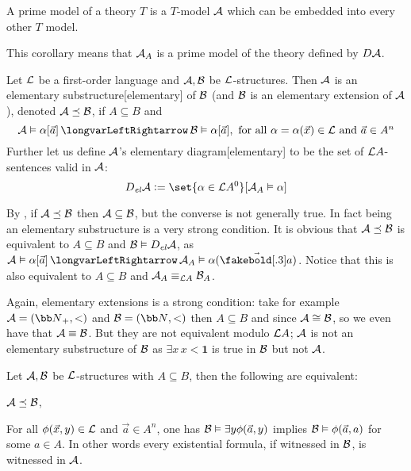 \bdefn

    A {\emphcolor prime model} of a theory $T$ is a $T$-model ${\cal A}$ which can be embedded into every other $T$ model.

\edefn

This corollary means that ${\cal A}_A$ is a prime model of the theory defined by $D{\cal A}$.

\bdefn

    Let ${\cal L}$ be a first-order language and ${\cal A},{\cal B}$ be ${\cal L}$-structures.
    Then ${\cal A}$ is an {\emphcolor elementary substructure}[elementary] of ${\cal B}$ (and ${\cal B}$ is an {\emphcolor elementary extension} of ${\cal A}$),
    denoted ${\cal A}\preceq{\cal B}$, if $A\subseteq B$ and
    $$ {\cal A}\vDash\alpha[\vec a]\iff {\cal B}\vDash\alpha[\vec a],\hbox{ for all $\alpha=\alpha(\vec x)\in{\cal L}$ and $\vec a\in A^n$} $$
    Further let us define ${\cal A}$'s {\emphcolor elementary diagram}[elementary] to be the set of ${\cal L}A$-sentences valid in ${\cal A}$:
    $$ D_{\it el}{\cal A}\coloneqq\set{\alpha\in{\cal L}A^0}[{\cal A}_A\vDash\alpha] $$

\edefn

By , if ${\cal A}\preceq{\cal B}$ then ${\cal A}\subseteq{\cal B}$, but the converse is not generally true.
In fact being an elementary substructure is a very strong condition.
It is obvious that ${\cal A}\preceq{\cal B}$ is equivalent to $A\subseteq B$ and ${\cal B}\vDash D_{\it el}{\cal A}$, as ${\cal A}\vDash\alpha[\vec a]\iff {\cal A}_A\vDash\alpha(\vec{\boldsymbol a})$.
Notice that this is also equivalent to $A\subseteq B$ and ${\cal A}_A\equiv_{{\cal L}A}{\cal B}_A$.

Again, elementary extensions is a strong condition: take for example ${\cal A}=({\bb N}_+,<)$ and ${\cal B}=({\bb N},<)$ then $A\subseteq B$ and since ${\cal A}\cong{\cal B}$, so we even have that
${\cal A}\equiv{\cal B}$.
But they are not equivalent modulo ${\cal L}A$; ${\cal A}$ is not an elementary substructure of ${\cal B}$ as $\exists x\,x<\boldsymbol1$ is true in ${\cal B}$ but not ${\cal A}$.

\bthrm[title=Tarski's Criterion, name=tarskicriterion]

    Let ${\cal A},{\cal B}$ be ${\cal L}$-structures with $A\subseteq B$, then the following are equivalent:
    \benum
        \item ${\cal A}\preceq{\cal B}$,
        \item For all $\phi(\vec x,y)\in{\cal L}$ and $\vec a\in A^n$, one has ${\cal B}\vDash\exists y\phi(\vec a,y)$ implies ${\cal B}\vDash\phi(\vec a,a)$ for some $a\in A$.
        In other words every existential formula, if witnessed in ${\cal B}$, is witnessed in ${\cal A}$.
    \eenum

